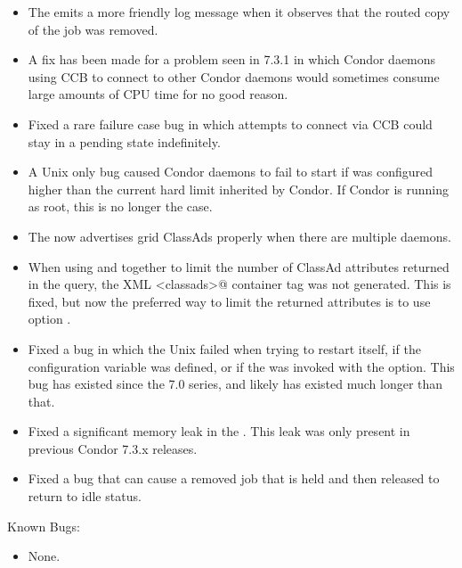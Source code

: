 \begin{itemize}
\item The  emits a more friendly log message when it
observes that the routed copy of the job was removed.

\item A fix has been made for a problem seen in 7.3.1 in which Condor daemons
using CCB to connect to other Condor daemons would sometimes consume
large amounts of CPU time for no good reason.

\item Fixed a rare failure case bug in which attempts to connect via
CCB could stay in a pending state indefinitely.

\item A Unix only bug caused Condor daemons to fail to start if
 was configured higher
than the current hard limit inherited by Condor.  If Condor is running
as root, this is no longer the case.

\item The  now advertises grid ClassAds properly when there
are multiple  daemons.

\item When using   and  together to
limit the number of ClassAd attributes returned in the query, the XML
\verb@<classads>@ container tag was not generated.  This is fixed, but
now the preferred way to limit the returned attributes is to
use  option .

\item Fixed a bug in which the Unix  failed
when trying to restart itself,
if the configuration variable  was defined,
or if the  was invoked with the  option.
This bug has existed since the 7.0 series,
and likely has existed much longer than that.

\item Fixed a significant memory leak in the . This
leak was only present in previous Condor 7.3.x releases.

\item Fixed a bug that can cause a removed job that is held and then
released to return to idle status.

\end{itemize}

\noindent Known Bugs:

\begin{itemize}

\item None.

\end{itemize}

